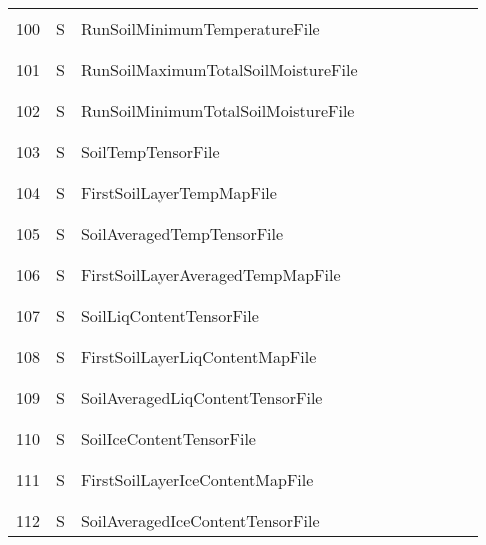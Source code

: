 \begin{longtable}{|c|c|l|c|c|c|c|p{}|c|p{}|}
&&&&&&&&&\\
100 & S & RunSoilMinimumTemperatureFile & & & & & & & \\
&&&&&&&&&\\\hline%
&&&&&&&&&\\
101 & S & RunSoilMaximumTotalSoilMoistureFile & & & & & & & \\
&&&&&&&&&\\\hline%
&&&&&&&&&\\
102 & S & RunSoilMinimumTotalSoilMoistureFile & & & & & & & \\
&&&&&&&&&\\\hline%
&&&&&&&&&\\
103 & S & SoilTempTensorFile & & & & & & & \\
&&&&&&&&&\\\hline%
&&&&&&&&&\\
104 & S & FirstSoilLayerTempMapFile & & & & & & & \\
&&&&&&&&&\\\hline%
&&&&&&&&&\\
105 & S & SoilAveragedTempTensorFile & & & & & & & \\
&&&&&&&&&\\\hline%
&&&&&&&&&\\
106 & S & FirstSoilLayerAveragedTempMapFile & & & & & & & \\
&&&&&&&&&\\\hline%
&&&&&&&&&\\
107 & S & SoilLiqContentTensorFile & & & & & & & \\
&&&&&&&&&\\\hline%
&&&&&&&&&\\
108 & S & FirstSoilLayerLiqContentMapFile & & & & & & & \\
&&&&&&&&&\\\hline%
&&&&&&&&&\\
109 & S & SoilAveragedLiqContentTensorFile & & & & & & & \\
&&&&&&&&&\\\hline%
&&&&&&&&&\\
110 & S & SoilIceContentTensorFile & & & & & & & \\
&&&&&&&&&\\\hline%
&&&&&&&&&\\
111 & S & FirstSoilLayerIceContentMapFile & & & & & & & \\
&&&&&&&&&\\\hline%
&&&&&&&&&\\
112 & S & SoilAveragedIceContentTensorFile & & & & & & & \\

\end{longtable}
